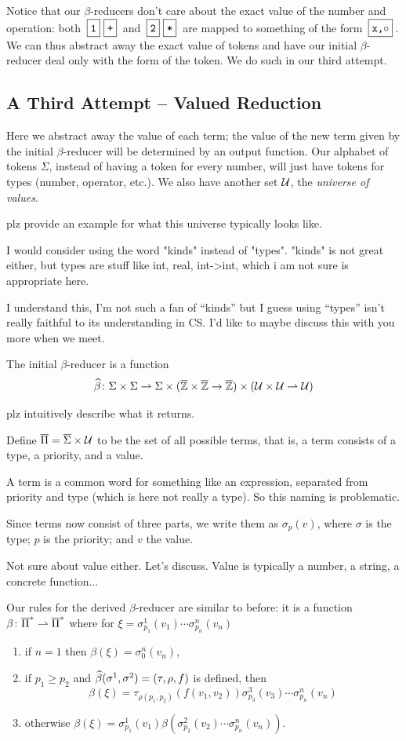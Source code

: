 \documentclass{llncs}
\newcommand{\yoni}[1]{{\begin{mdframed}[linecolor=red]{\color{red}#1}\end{mdframed}}}
\newcommand{\ari}[1]{{\begin{mdframed}[linecolor=blue]{\color{blue}#1}\end{mdframed}}}
\begin{document}
Notice that our $\beta$-reducers don't care about the exact value of the number and operation: both $\mbt1\mbt+$ and $\mbt2\mbt*$ are mapped to something of the form $\mbt{x,$\circ$}$.
We can thus abstract away the exact value of tokens and have our initial $\beta$-reducer deal only with the form of the token.
We do such in our third attempt.

\subsection{A Third Attempt -- Valued Reduction} \label{valued-reduction}

Here we abstract away the value of each term; the value of the new term given by the initial $\beta$-reducer will be determined by an output function.
Our alphabet of tokens $\Sigma$, instead of having a token for every number, will just have tokens for types (number, operator, etc.).
We also have another set $\mathcal U$, the \textit{universe of values}.
\yoni{plz provide an example for what this universe typically looks like.}

\yoni{I would consider using the word "kinds" instead of "types". "kinds" is not great either, but types are stuff like int, real, int->int, which i am not sure is appropriate here.}
\ari{I understand this, I'm not such a fan of ``kinds'' but I guess using ``types'' isn't really faithful to its understanding in CS.
I'd like to maybe discuss this with you more when we meet.}

The initial $\beta$-reducer is a function
\[ \widehat\beta \colon \Sigma\times\Sigma \rightharpoonup \Sigma\times(\overline{\mathbb Z}\times\overline{\mathbb Z}\to\overline{\mathbb Z})\times(\mathcal U\times\mathcal U\rightharpoonup\mathcal U) \]

\yoni{plz intuitively describe what it returns.}

Define $\overline\Pi=\overline\Sigma\times\mathcal U$ to be the set of all possible terms,
that is, 
a term consists of a type, a priority, and a value.
\yoni{A term is a common word for something like an expression, separated from priority and type (which is here not really a type). So this naming is problematic.}
Since terms now consist of three parts, we write them as $\sigma_p(v)$, where $\sigma$ is the type; $p$ is the priority; and $v$ the value.
\yoni{Not sure about value either. Let's discuss. Value is typically a number, a string, a concrete function...}

Our rules for the derived $\beta$-reducer are similar to before: it is a function $\beta\colon\overline\Pi^* \rightharpoonup \overline\Pi^*$ where for $\xi=\sigma^1_{p_1}(v_1)\cdots\sigma^n_{p_n}(v_n)$
\begin{enumerate}
    \item if $n=1$ then $\beta(\xi)=\sigma^n_0(v_n)$,
    \item if $p_1\geq p_2$ and $\widehat\beta(\sigma^1,\sigma^2)=(\tau,\rho,f)$ is defined, then
    \[ \beta(\xi)=\tau_{\rho(p_1,p_2)}(f(v_1,v_2))\sigma^3_{p_3}(v_3)\cdots\sigma^n_{p_n}(v_n) \]
    \item otherwise $\beta(\xi)=\sigma^1_{p_1}(v_1)\beta(\sigma^2_{p_2}(v_2)\cdots\sigma^n_{p_n}(v_n))$.
\end{enumerate}
\end{document}
